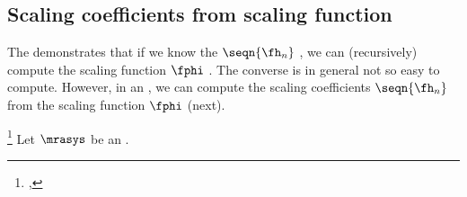 \subsection{Scaling coefficients from scaling function}
The   demonstrates that if we know
the  $\seqn{\fh_n}$ , we can
(recursively) compute the scaling function $\fphi$ .
The converse is in general not so easy to compute.
However, in an ,
we can compute the scaling coefficients $\seqn{\fh_n}$ from the scaling function $\fphi$ (next).
\begin{proposition}
\footnote{
  ,
  }
\label{prop:phi->h}
Let $\mrasys$ be an  .
\end{proposition}
